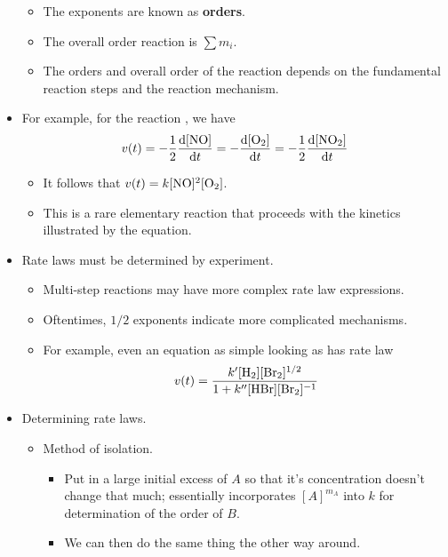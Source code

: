 \documentclass[../notes.tex]{subfiles}
\begin{document}
\begin{itemize}
\begin{itemize}
\begin{equation*}
        \end{equation*}
        \item The exponents are known as \textbf{orders}.
        \item The overall order reaction is $\sum m_i$.
        \item The orders and overall order of the reaction depends on the fundamental reaction steps and the reaction mechanism.
    \end{itemize}
    \item For example, for the reaction , we have
    \begin{equation*}
        v(t) = -\frac{1}{2}\dv{[\ce{NO}]}{t}
        = -\dv{[\ce{O2}]}{t}
        = -\frac{1}{2}\dv{[\ce{NO2}]}{t}
    \end{equation*}
    \begin{itemize}
        \item It follows that $v(t)=k[\ce{NO}]^2[\ce{O2}]$.
        \item This is a rare elementary reaction that proceeds with the kinetics illustrated by the equation.
    \end{itemize}
    \item Rate laws must be determined by experiment.
    \begin{itemize}
        \item Multi-step reactions may have more complex rate law expressions.
        \item Oftentimes, $1/2$ exponents indicate more complicated mechanisms.
        \item For example, even an equation as simple looking as  has rate law
        \begin{equation*}
            v(t) = \frac{k'[\ce{H2}][\ce{Br2}]^{1/2}}{1+k''[\ce{HBr}][\ce{Br2}]^{-1}}
        \end{equation*}
    \end{itemize}
    \item Determining rate laws.
    \begin{itemize}
        \item Method of isolation.
        \begin{itemize}
            \item Put in a large initial excess of $A$ so that it's concentration doesn't change that much; essentially incorporates $[A]^{m_A}$ into $k$ for determination of the order of $B$.
            \item We can then do the same thing the other way around.

\end{itemize}
\end{itemize}
\end{itemize}
\end{document}
